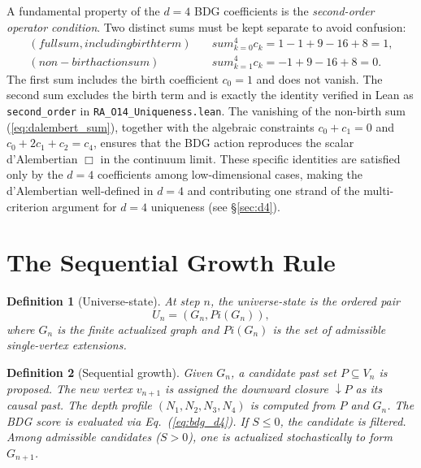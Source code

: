 \documentclass[11pt]{article}
\def\Pi{Pi}%
\def\text#1{#1}%
\def\sum{sum}%
\newtheorem{definition}{Definition}
\newcommand{\Pot}{\Pi}
\begin{document}
A fundamental property of the $d=4$ BDG coefficients is the \emph{second-order operator condition}. Two distinct sums must be kept separate to avoid confusion:
\begin{align}
\label{eq:full_sum}
\text{(full sum, including birth term)}\quad & \sum_{k=0}^{4} c_k = 1-1+9-16+8 = 1,\\
\label{eq:dalembert_sum}
\text{(non-birth action sum)}\quad & \sum_{k=1}^{4} c_k = -1+9-16+8 = 0.
\end{align}
The first sum includes the birth coefficient $c_0=1$ and does not vanish. The second sum excludes the birth term and is exactly the identity verified in Lean as \texttt{second\_order} in \texttt{RA\_O14\_Uniqueness.lean}. The vanishing of the non-birth sum (\ref{eq:dalembert_sum}), together with the algebraic constraints $c_0+c_1=0$ and $c_0+2c_1+c_2=c_4$, ensures that the BDG action reproduces the scalar d'Alembertian $\Box$ in the continuum limit. These specific identities are satisfied only by the $d=4$ coefficients among low-dimensional cases, making the d'Alembertian well-defined in $d=4$ and contributing one strand of the multi-criterion argument for $d=4$ uniqueness (see \S\ref{sec:d4}).

\section{The Sequential Growth Rule}
\label{sec:engine}

\begin{definition}[Universe-state]
At step $n$, the universe-state is the ordered pair
\begin{equation}
U_n=(G_n,\Pot(G_n)),
\end{equation}
where $G_n$ is the finite actualized graph and $\Pot(G_n)$ is the set of admissible single-vertex extensions.
\end{definition}

\begin{definition}[Sequential growth]
Given $G_n$, a candidate past set $P\subseteq V_n$ is proposed. The new vertex $v_{n+1}$ is assigned the downward closure $\downarrow\!P$ as its causal past. The depth profile $(N_1,N_2,N_3,N_4)$ is computed from $P$ and $G_n$. The BDG score is evaluated via Eq.~(\ref{eq:bdg_d4}). If $S\le 0$, the candidate is filtered. Among admissible candidates ($S>0$), one is actualized stochastically to form $G_{n+1}$.
\end{definition}
\end{document}
